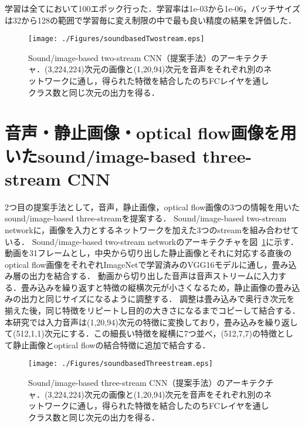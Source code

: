 学習は全てにおいて100エポック行った．学習率は1e-03から1e-06，バッチサイズは32から128の範囲で学習毎に変え制限の中で最も良い精度の結果を評価した．


\begin{figure}[htbp]
 \begin{center}
  \texttt{[image: ./Figures/soundbasedTwostream.eps]}
  \caption{Sound/image-based two-stream CNN（提案手法）のアーキテクチャ．(3,224,224)次元の画像と(1,20,94)次元を音声をそれぞれ別のネットワークに通し，得られた特徴を結合したのちFCレイヤを通しクラス数と同じ次元の出力を得る．}
  \label{sound-two-stream}
 \end{center}
\end{figure}



\section{音声・静止画像・optical flow画像を用いたsound/image-based three-stream CNN}
2つ目の提案手法として，音声，静止画像，optical flow画像の3つの情報を用いたsound/image-based three-streamを提案する．
Sound/image-based two-stream networkに，画像を入力とするネットワークを加えた3つのstreamを組み合わせている．
Sound/image-based two-stream networkのアーキテクチャを図~\ref{sound-two-stream}に示す．
動画を31フレームとし，中央から切り出した静止画像とそれに対応する直後のoptical flow画像をそれぞれImageNetで学習済みのVGG16モデルに通し，畳み込み層の出力を結合する．
動画から切り出した音声は音声ストリームに入力する．畳み込みを繰り返すと特徴の縦横次元が小さくなるため，静止画像の畳み込みの出力と同じサイズになるように調整する．
調整は畳み込みで奥行き次元を揃えた後，同じ特徴をリピートし目的の大きさになるまでコピーして結合する．
本研究では入力音声は(1,20,94)次元の特徴に変換しており，畳み込みを繰り返して(512,1,1)次元にする．この細長い特徴を縦横に7つ並べ，(512,7,7)の特徴として静止画像とoptical flowの結合特徴に追加で結合する．

\begin{figure}[htbp]
 \begin{center}
  \texttt{[image: ./Figures/soundbasedThreestream.eps]}
  \caption{Sound/image-based three-stream CNN（提案手法）のアーキテクチャ．(3,224,224)次元の画像と(1,20,94)次元を音声をそれぞれ別のネットワークに通し，得られた特徴を結合したのちFCレイヤを通しクラス数と同じ次元の出力を得る．}
  \label{sound-three-stream}
 \end{center}
\end{figure}
